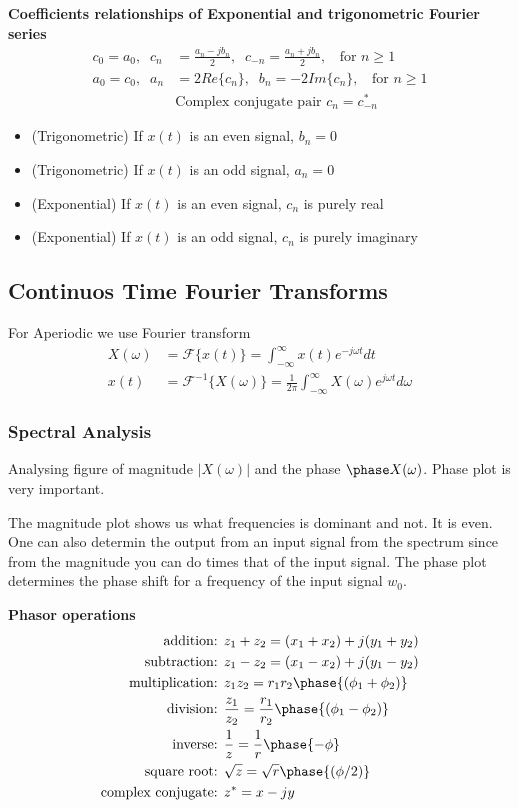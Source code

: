 \begin{multicols}{2}
\textbf{Coefficients relationships of Exponential and trigonometric Fourier series}
\begin{align*}
    c_0=a_0, \;\; c_n&= \frac{a_n-jb_n}{2}, \;\; c_{-n}=\frac{a_n+jb_n}{2}, \;\; 
    \text{ for } n\geq 1 \\
    a_0=c_0, \;\; a_n&= 2Re\{c_n\}, \;\; b_{n}= -2Im\{c_n\}, \;\; 
    \text{ for } n\geq 1 \\
    &\text{Complex conjugate pair } c_n = c^*_{-n}
\end{align*}

\begin{itemize}
    \item (Trigonometric) If $x(t)$ is an even signal, $b_n=0$
    \item (Trigonometric) If $x(t)$ is an odd signal, $a_n=0$
    \item (Exponential) If $x(t)$ is an even signal, $c_n$ is purely real
    \item (Exponential) If $x(t)$ is an odd signal, $c_n$ is purely imaginary
\end{itemize}


\subsection{Continuos Time Fourier Transforms}
For Aperiodic we use Fourier transform
\begin{align*}
    X(\omega) &= \mathcal{F}\{x(t)\} = \int_{-\infty}^{\infty} x(t) e^{-j\omega t} dt \\
    x(t) &= \mathcal{F}^{-1}\{X(\omega)\} = \frac{1}{2\pi} \int_{-\infty}^{\infty} X(\omega) 
    e^{j\omega t} d\omega
\end{align*}

\subsubsection{Spectral Analysis}
Analysing figure of magnitude $|X(\omega)|$ and the phase $\phase X(\omega)$.
Phase plot is very important. 

The magnitude plot shows us what frequencies is dominant and not. It is even. 
One can also determin the output from an input signal from the spectrum since from the 
magnitude you can do times that of the input signal. 
The phase plot determines the phase shift for a frequency of the input signal $w_0$.


\textbf{Phasor operations}
\begin{align*}
    \text{addition: }& z_1+z_2 = (x_1+x_2)+j(y_1+y_2) \\
    \text{subtraction: }& z_1-z_2 = (x_1-x_2)+j(y_1-y_2) \\
    \text{multiplication: }& z_1z_2 = r_1r_2\phase{(\phi_1+\phi_2)} \\
    \text{division: }& \frac{z_1}{z_2} = \frac{r_1}{r_2}\phase{(\phi_1-\phi_2)} \\
    \text{inverse: }& \frac{1}{z} = \frac{1}{r}\phase{-\phi} \\
    \text{square root: }& \sqrt{z} = \sqrt{r}\phase{(\phi/2)} \\
    \text{complex conjugate: }& z^* = x-jy
\end{align*}



\end{multicols}
